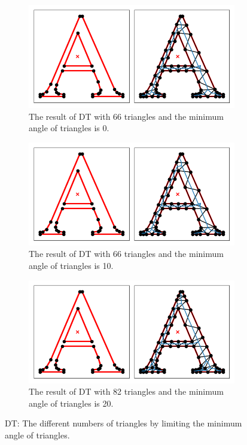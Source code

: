 \documentclass[]{article}
\begin{document}
\begin{figure}[ht]
    \centering
    \begin{subfigure}{0.30\textwidth}
        \centering
        \includegraphics[width=1\linewidth]{dt1_66.png}
        \caption{The result of DT with 66 triangles and the minimum angle of triangles is 0.}
        \label{fig:dt1}
    \end{subfigure}
    \hfill  %
    \begin{subfigure}{0.30\textwidth}
        \centering
        \includegraphics[width=\linewidth]{dt2_66.png}
        \caption{The result of DT with 66 triangles and the minimum angle of triangles is 10.}
        \label{fig:dt2}
    \end{subfigure}
    \hfill  %
    \begin{subfigure}{0.30\textwidth}
        \centering
        \includegraphics[width=\linewidth]{dt3_82.png}
        \caption{The result of DT with 82 triangles and the minimum angle of triangles is 20.}
        \label{fig:dt3}
    \end{subfigure}
    \caption{
        DT: The different numbers of triangles by limiting the minimum angle of triangles.
    }
    \label{fig:q3dt}
\end{figure}
\end{document}
